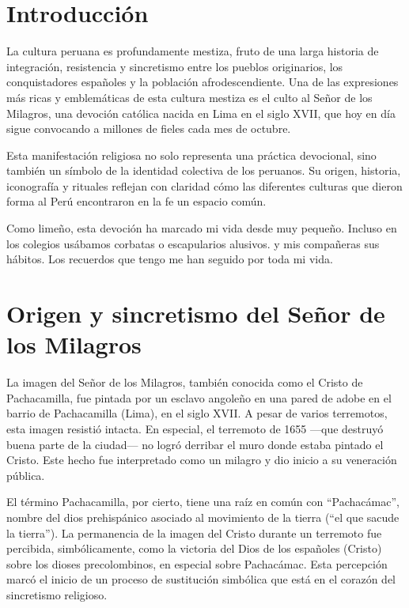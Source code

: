 \documentclass[a4paper,12pt]{article}
\begin{document}

		
		\tableofcontents
		\newpage
		
		\section{Introducción}
		La cultura peruana es profundamente mestiza, fruto de una larga historia de integración, resistencia y sincretismo entre los pueblos originarios, los conquistadores españoles y la población afrodescendiente. Una de las expresiones más ricas y emblemáticas de esta cultura mestiza es el culto al Señor de los Milagros, una devoción católica nacida en Lima en el siglo XVII, que hoy en día sigue convocando a millones de fieles cada mes de octubre.
		
		Esta manifestación religiosa no solo representa una práctica devocional, sino también un símbolo de la identidad colectiva de los peruanos. Su origen, historia, iconografía y rituales reflejan con claridad cómo las diferentes culturas que dieron forma al Perú encontraron en la fe un espacio común.
		
		Como limeño, esta devoción ha marcado mi vida desde muy pequeño. Incluso en los colegios usábamos corbatas o escapularios alusivos. y mis compañeras sus hábitos. Los recuerdos que tengo me han seguido por toda mi vida.
		
		\section{Origen y sincretismo del Señor de los Milagros}
		La imagen del Señor de los Milagros, también conocida como el Cristo de Pachacamilla, fue pintada por un esclavo angoleño en una pared de adobe en el barrio de Pachacamilla (Lima), en el siglo XVII. A pesar de varios terremotos, esta imagen resistió intacta. En especial, el terremoto de 1655 —que destruyó buena parte de la ciudad— no logró derribar el muro donde estaba pintado el Cristo. Este hecho fue interpretado como un milagro y dio inicio a su veneración pública.
		
		El término Pachacamilla, por cierto, tiene una raíz en común con “Pachacámac”, nombre del dios prehispánico asociado al movimiento de la tierra (“el que sacude la tierra”). La permanencia de la imagen del Cristo durante un terremoto fue percibida, simbólicamente, como la victoria del Dios de los españoles (Cristo) sobre los dioses precolombinos, en especial sobre Pachacámac. Esta percepción marcó el inicio de un proceso de sustitución simbólica que está en el corazón del sincretismo religioso.
		
\end{document}
